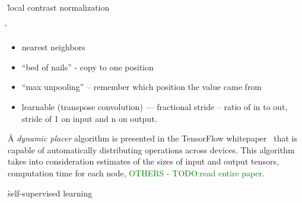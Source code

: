 \r{local contrast normalization}

\r{\begin{itemize}[noitemsep,topsep=0pt]
		\item nearest neighbors
		\item ``bed of nails'' - copy to one position
		\item ``max unpooling'' -- remember which position the value came from
		\item learnable (transpose convolution) --- fractional stride -- ratio of in to out, stride of 1 on input and n on output.
	\end{itemize}
}



\r{A \textit{dynamic placer} algorithm is presented in the {TensorFlow whitepaper}~\cite{abadi2016tensorflow_device_placement} that is capable of automatically distributing operations across devices. This algorithm takes into consideration  estimates of the sizes of input and output tensors, computation time for each node, \textcolor{green}{OTHERS - TODO:read entire paper}.}

\r{self-supervised learning}



